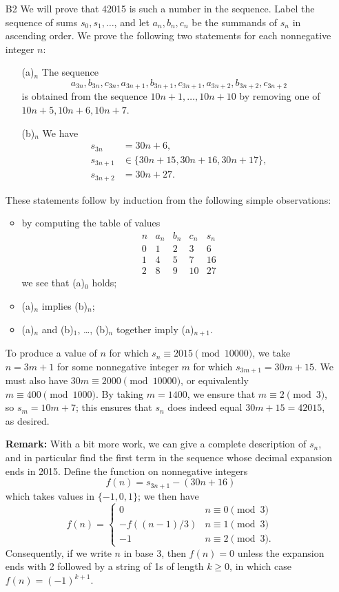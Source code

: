 \documentclass[amssymb,twocolumn,pra,10pt,aps]{revtex4-1}
\begin{document}
\begin{itemize}
\item[B2]
We will prove that 42015 is such a number in the sequence.
Label the sequence of sums $s_0, s_1, \dots$, and let $a_n, b_n, c_n$ be the summands of $s_n$ in ascending order. We prove the following two statements for each nonnegative integer $n$: \begin{enumerate}
\item[(a)$_n$]
The sequence
\[
a_{3n}, b_{3n}, c_{3n}, a_{3n+1}, b_{3n+1}, c_{3n+1},
a_{3n+2}, b_{3n+2}, c_{3n+2}
\]
is obtained from the sequence $10n+1, \dots, 10n+10$ by removing one of $10n+5, 10n+6, 10n+7$.
\item[(b)$_n$]
We have
\begin{align*}
s_{3n} &= 30n+6,\\
s_{3n+1} &\in \{30n+15, 30n+16, 30n+17\}, \\
s_{3n+2} &= 30n+27.
\end{align*}
\end{enumerate}
These statements follow by induction from the following simple observations:
\begin{itemize}
\item
by computing the table of values
\[
\begin{array}{c|cccc}
n & a_n & b_n & c_n & s_n \\
\hline
 0 &  1 &  2 &  3 &  6 \\
 1 &  4 &  5 &  7 & 16 \\
 2 &  8 &  9 & 10 & 27
\end{array}
\]
we see that (a)$_0$ holds;
\item
(a)$_n$ implies (b)$_n$;
\item
(a)$_n$ and (b)$_1$, \dots, (b)$_n$ together imply (a)$_{n+1}$.
\end{itemize}
To produce a value of $n$ for which $s_n \equiv 2015 \pmod{10000}$, we take $n = 3m+1$ for some nonnegative integer $m$ for which $s_{3m+1} = 30m+15$. We must also have $30m \equiv 2000 \pmod{10000}$, or equivalently $m \equiv 400 \pmod{1000}$.
By taking $m = 1400$, we ensure that $m \equiv 2 \pmod{3}$, so $s_m = 10m + 7$; this ensures that $s_{n}$ does indeed equal $30m+15 = 42015$, as desired.

\noindent
\textbf{Remark:}
With a bit more work, we can give a complete description of $s_n$, and in particular find the first term in the sequence whose decimal expansion ends in 2015.
Define the function on nonnegative integers
\[
f(n) = s_{3n+1} - (30n + 16)
\]
which takes values in $\{-1, 0, 1\}$; we then have
\[
f(n) = \begin{cases} 0 & n \equiv 0 \pmod{3} \\
-f((n-1)/3) & n \equiv 1 \pmod{3} \\
-1 & n \equiv 2 \pmod{3}.
\end{cases}
\]
Consequently, if we write $n$ in base 3, then $f(n) = 0$ unless the expansion ends with 2 followed by a string of 1s of length $k \geq 0$, in which case $f(n) = (-1)^{k+1}$.


\end{itemize}
\end{document}
